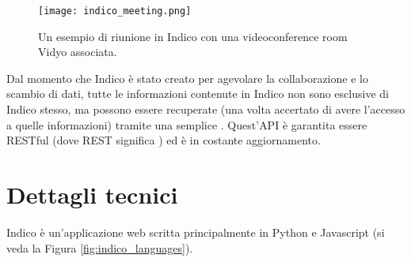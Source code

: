 		\begin{figure}[h!]
			\begin{center}
				\texttt{[image: indico\_meeting.png]}
			\end{center}
			\caption[Meeting in Indico (esempio)]{Un esempio di riunione in Indico con una videoconference room Vidyo associata.}
			\label{fig:indico_category}
		\end{figure}
		\noindent
		Dal momento che Indico è stato creato per agevolare la collaborazione e lo scambio di dati, tutte le informazioni contenute in Indico non sono esclusive di Indico stesso, ma possono essere recuperate (una volta accertato di avere l'accesso a quelle informazioni) tramite una semplice . Quest'\ac{API} è garantita essere RESTful  (dove \acs{REST} significa ) ed è in costante aggiornamento.
		
	\section{Dettagli tecnici} \label{sec:indico;dettagli_tecnici}
	
		Indico è un'applicazione web scritta principalmente in Python e Javascript (si veda la Figura \ref{fig:indico_languages}).\\
		
